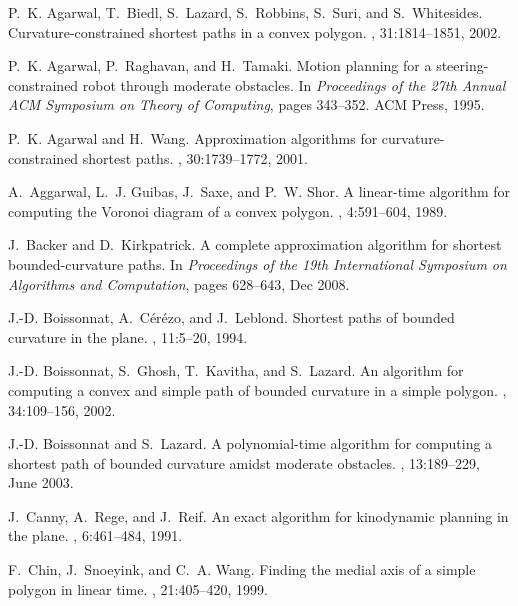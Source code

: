 \documentclass[a4paper]{article}
\begin{document}
\begin{thebibliography}{10}

P.~K. Agarwal, T.~Biedl, S.~Lazard, S.~Robbins, S.~Suri, and S.~Whitesides.
\newblock Curvature-constrained shortest paths in a convex polygon.
, 31:1814--1851, 2002.

P.~K. Agarwal, P.~Raghavan, and H.~Tamaki.
\newblock Motion planning for a steering-constrained robot through moderate
  obstacles.
\newblock In {\em Proceedings of the 27th Annual ACM Symposium on Theory of
  Computing}, pages 343--352. ACM Press, 1995.

P.~K. Agarwal and H.~Wang.
\newblock Approximation algorithms for curvature-constrained shortest paths.
, 30:1739--1772, 2001.

A.~Aggarwal, L.~J. Guibas, J.~Saxe, and P.~W. Shor.
\newblock A linear-time algorithm for computing the {Voronoi} diagram of a
  convex polygon.
, 4:591--604, 1989.

J.~Backer and D.~Kirkpatrick.
\newblock A complete approximation algorithm for shortest bounded-curvature
  paths.
\newblock In {\em Proceedings of the 19th International Symposium on Algorithms
  and Computation}, pages 628--643, Dec 2008.

J.-D. Boissonnat, A.~C\'er\'ezo, and J.~Leblond.
\newblock Shortest paths of bounded curvature in the plane.
, 11:5--20, 1994.

J.-D. Boissonnat, S.~Ghosh, T.~Kavitha, and S.~Lazard.
\newblock An algorithm for computing a convex and simple path of bounded
  curvature in a simple polygon.
, 34:109--156, 2002.

J.-D. Boissonnat and S.~Lazard.
\newblock A polynomial-time algorithm for computing a shortest path of bounded
  curvature amidst moderate obstacles.
, 13:189--229, June 2003.

J.~Canny, A.~Rege, and J.~Reif.
\newblock An exact algorithm for kinodynamic planning in the plane.
, 6:461--484, 1991.

F.~Chin, J.~Snoeyink, and C.~A. Wang.
\newblock Finding the medial axis of a simple polygon in linear time.
, 21:405--420, 1999.


\end{thebibliography}
\end{document}

